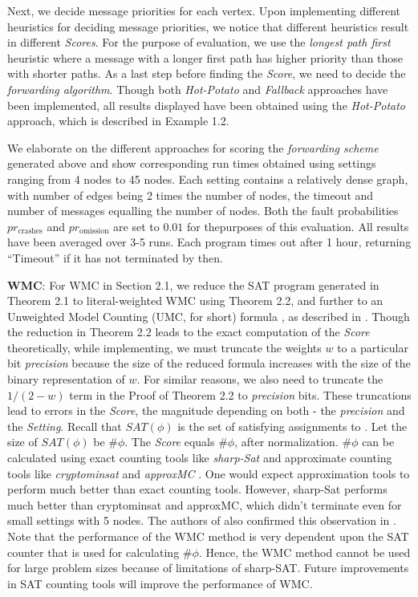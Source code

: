 \documentclass{sig-alternate-05-2015}[9pt]
\theoremstyle{definition}
\begin{document}
		Next, we decide message priorities for each vertex. Upon implementing different heuristics for deciding message priorities, we notice that different heuristics result in different {\em Scores}. For the purpose of evaluation, we use the {\em longest path first} heuristic where a message with a longer first path has higher priority than those with shorter paths. 
		As a last step before finding the {\em Score}, we need to decide the {\em forwarding algorithm}. Though both {\em Hot-Potato} and {\em Fallback} approaches have been implemented, all results displayed have been obtained using the {\em Hot-Potato} approach, which is described in Example 1.2. 

		We elaborate on the different approaches for scoring the {\em forwarding scheme} generated above and show corresponding run times obtained using settings ranging from 4 nodes to 45 nodes. Each setting contains a relatively dense graph, with number of edges being 2 times the number of nodes, the timeout and number of messages equalling the number of nodes. Both the fault probabilities $pr_{\text{crashes}}$ and $pr_{\text{omission}}$ are set to $0.01$ for thepurposes of this evaluation. All results have been averaged over 3-5 runs. Each program times out after 1 hour, returning ``Timeout'' if it has not terminated by then.

		{\bf WMC}: 
		For WMC in Section 2.1, we reduce the SAT program generated in Theorem 2.1 to literal-weighted WMC using Theorem 2.2, and further to an Unweighted Model Counting (UMC, for short) formula \phi, as described in \cite{Weightd to Unweighted}. Though the reduction in Theorem 2.2 leads to the exact computation of the {\em Score} theoretically, while implementing, we must truncate the weights $w$ to a particular bit {\em precision} because the size of the reduced formula increases with the size of the binary representation of $w$. For similar reasons, we also need to truncate the $1/(2-w)$ term in the Proof of Theorem 2.2 to {\em precision} bits. These truncations lead to errors in the {\em Score}, the magnitude depending on both - the {\em precision} and the {\em Setting}.
		Recall that $SAT(\phi)$ is the set of satisfying assignments to \phi. Let the size of $SAT(\phi)$ be $\#\phi$. The {\em Score} equals $\#\phi$, after normalization. $\#\phi$ can be calculated using exact counting tools like {\em sharp-Sat} \cite{sharpSAT} and approximate counting tools like {\em cryptominsat} \cite{cryptominsat} and {\em approxMC} \cite{approxMC}. One would expect approximation tools to perform much better than exact counting tools. However, sharp-Sat performs much better than cryptominsat and approxMC, which didn't terminate even for small settings with 5 nodes. The authors of \cite{approxMC} also confirmed this observation in \cite{this}%
		. Note that the performance of the WMC method is very dependent upon the SAT counter that is used for calculating $\#\phi$. Hence, the WMC method cannot be used for large problem sizes because of limitations of sharp-SAT. Future improvements in SAT counting tools will improve the performance of WMC.
\end{document}
